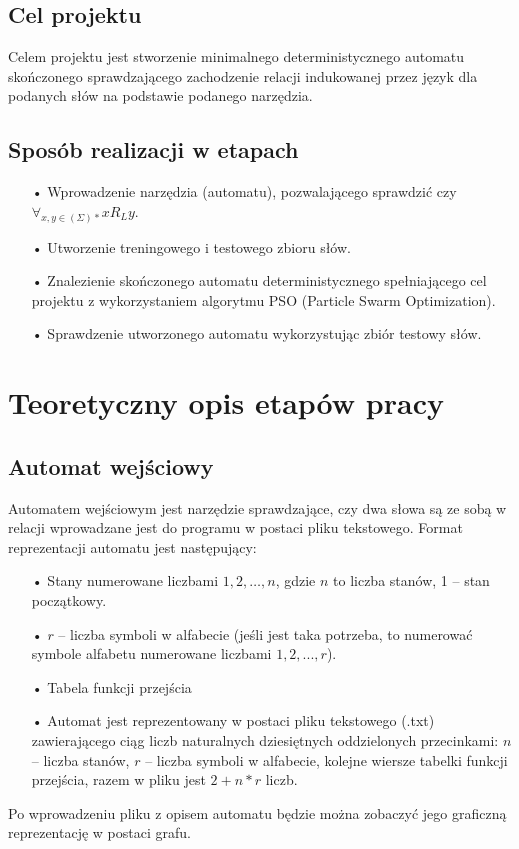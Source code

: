 \documentclass{llncs}
\begin{document}
\subsection{Cel projektu}

Celem projektu jest stworzenie minimalnego deterministycznego automatu skończonego sprawdzającego zachodzenie relacji indukowanej przez język dla podanych słów na podstawie podanego narzędzia.

\subsection{Sposób realizacji w etapach}

\begin{enumerate}
	\item[•] Wprowadzenie narzędzia (automatu), pozwalającego sprawdzić czy $\forall_{x,y \in (\Sigma)*} x R_{L} y$.
	\item[•] Utworzenie treningowego i testowego zbioru słów.
	\item[•] Znalezienie skończonego automatu deterministycznego spełniającego cel projektu z wykorzystaniem algorytmu PSO (Particle Swarm Optimization).
	\item[•] Sprawdzenie utworzonego automatu wykorzystując zbiór testowy słów.
\end{enumerate}

\newpage

\section{Teoretyczny opis etapów pracy}

\subsection{Automat wejściowy}

Automatem wejściowym jest narzędzie sprawdzające, czy dwa słowa są ze sobą w relacji wprowadzane jest do programu w postaci pliku tekstowego. Format reprezentacji automatu jest następujący:

\begin{itemize}
	\item[•] Stany numerowane liczbami $1, 2, …, n$, gdzie $n$ to liczba stanów, 1 – stan początkowy.
	\item[•] $r$ – liczba symboli w alfabecie (jeśli jest taka potrzeba, to numerować symbole alfabetu numerowane liczbami $1, 2, ..., r$).
	\item[•] Tabela funkcji przejścia
	\item[•] Automat jest reprezentowany w postaci pliku tekstowego (.txt) zawierającego ciąg liczb naturalnych dziesiętnych oddzielonych przecinkami: $n$ – liczba stanów, $r$ – liczba symboli w alfabecie, kolejne wiersze tabelki funkcji przejścia, razem w pliku jest $2 + n*r$ liczb.
\end{itemize}
Po wprowadzeniu pliku z opisem automatu będzie można zobaczyć jego graficzną reprezentację w postaci grafu.
\end{document}

